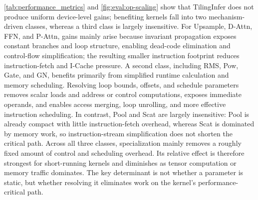 {\color{blue}%
\autoref{tab:performance_metrics} and \autoref{fig:eval:op-scaling} show that TilingInfer does not produce uniform device-level gains; benefiting kernels fall into two mechanism-driven classes, whereas a third class is largely insensitive. For Upsample, D-Attn, FFN, and P-Attn, gains mainly arise because invariant propagation exposes constant branches and loop structure, enabling dead-code elimination and control-flow simplification; the resulting smaller instruction footprint reduces instruction-fetch and I-Cache pressure. A second class, including RMS, Pow, Gate, and GN, benefits primarily from simplified runtime calculation and memory scheduling. Resolving loop bounds, offsets, and schedule parameters removes scalar loads and address or control computations, exposes immediate operands, and enables access merging, loop unrolling, and more effective instruction scheduling. In contrast, Pool and Scat are largely insensitive: Pool is already compact with little instruction-fetch overhead, whereas Scat is dominated by memory work, so instruction-stream simplification does not shorten the critical path. Across all three classes, specialization mainly removes a roughly fixed amount of control and scheduling overhead. Its relative effect is therefore strongest for short-running kernels and diminishes as tensor computation or memory traffic dominates. The key determinant is not whether a parameter is static, but whether resolving it eliminates work on the kernel's performance-critical path.
\par}
